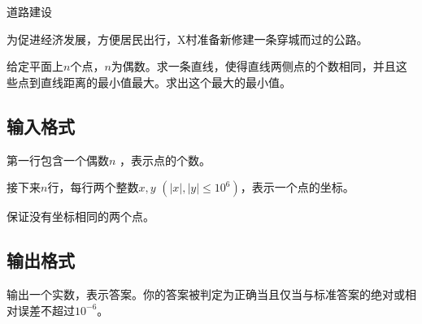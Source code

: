 \begin{Problem}{道路建设}{}

为促进经济发展，方便居民出行，X村准备新修建一条穿城而过的公路。

给定平面上$n$个点，$n$为偶数。求一条直线，使得直线两侧点的个数相同，并且这些点到直线距离的最小值最大。求出这个最大的最小值。

\subsection*{输入格式}

第一行包含一个偶数$n$ ，表示点的个数。

接下来$n$行，每行两个整数$x, y$ $(|x|, |y| \leq 10^6)$，表示一个点的坐标。

保证没有坐标相同的两个点。

\subsection*{输出格式}

输出一个实数，表示答案。你的答案被判定为正确当且仅当与标准答案的绝对或相对误差不超过$10^{-6}$。


\end{Problem}
